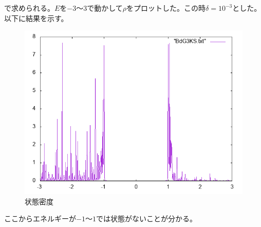 \documentclass{jarticle}
\begin{document}
で求められる。$E$を$-3$〜$3$で動かして$\rho$をプロットした。この時$\delta=10^{-3}$とした。
以下に結果を示す。
\begin{figure}[H]
	\centering
	\includegraphics[scale=0.7]{BdG3KS1.png}
	\caption{状態密度}
\end{figure}
ここからエネルギーが$-1$〜$1$では状態がないことが分かる。
\end{document}
